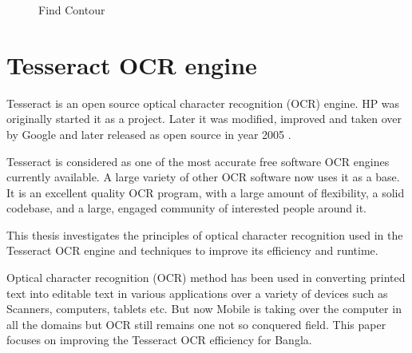\begin{figure}[H]
\centering
{}
\caption {Find Contour}
\label {fig:ContourDetection}
\end{figure}

\section{Tesseract OCR engine}
Tesseract is an open source optical character recognition (OCR) engine. HP was originally started it as a project. Later it was modified, improved and taken over by Google and later released as open source in year 2005\cite{TesseractORCEngine} \cite{TesseractORCEngineOfficialWeb}.

Tesseract is considered as one of the most accurate free software OCR engines currently available. A large variety of other OCR software now uses it as a base. It is an excellent quality OCR program, with a large amount of flexibility, a solid codebase, and a large, engaged community of interested people around it.

This thesis investigates the principles of optical character recognition used in the Tesseract OCR engine and techniques to improve its efficiency and runtime. 

Optical character recognition (OCR) method has been used in converting printed text into editable text in various applications over a variety of devices such as Scanners, computers, tablets etc. But now Mobile is taking over the computer in all the domains but OCR still remains one not so conquered field. This paper focuses on improving the Tesseract OCR efficiency for Bangla. 

